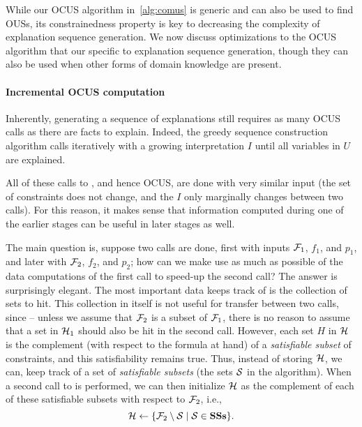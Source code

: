 While our OCUS algorithm in~\ref{alg:comus} is generic and can also be used to find OUSs, its constrainedness property is key to decreasing the complexity of explanation sequence generation. We now discuss optimizations to the OCUS algorithm that our specific to explanation sequence generation, though they can also
be used when other forms of domain knowledge are present.  


\paragraph{Incremental OCUS computation}
Inherently, generating a sequence of explanations still requires as many OCUS calls as there are facts to explain. 
Indeed, the greedy sequence construction algorithm %
calls \onestepo iteratively with a growing interpretation $I$ until all variables in $U$ are explained. %

All of these calls to \onestepo, and hence OCUS, are done with very similar input (the set of constraints does not change, and the $I$ only marginally changes between two calls). For this reason, it makes sense that information computed during one of the earlier stages can be useful in later stages as well. 

The main question is, suppose two \comus calls are done, first with inputs $\mathcal{F} _1$, $f_1$, and $p_1$, and later with $\mathcal{F} _2$, $f_2$, and $p_2$; how can we make use as much as possible of the data computations of the first call to speed-up the second call? The answer is surprisingly elegant. The most important data \comus keeps track of  is the collection \setstohit of sets to hit.  This  collection in itself is not useful for transfer between two calls, since -- unless we assume that $\mathcal{F} _2$ is a subset of $\mathcal{F} _1$, there is no reason to assume that a set in $\mathcal{H} _1$ should also be hit in the second call. 
However, each set $H$ in $\mathcal{H} $ is the complement (with respect to the formula at hand) of a \emph{satisfiable subset} of constraints, and this satisfiability remains true. 
Thus, instead of storing $\mathcal{H} $, we can, keep track of a set \satsets of \emph{satisfiable subsets} (the sets $\mathcal{S}$ in the \comus algorithm). 
When a second call to \comus is performed, we can then initialize $\mathcal{H} $ as the complement of each of these satisfiable subsets with respect to $\mathcal{F} _2$, i.e., \[\mathcal{H} \gets \{\mathcal{F} _2\setminus \mathcal{S}\mid \mathcal{S}\in \mathbf{SSs}\}.\]

